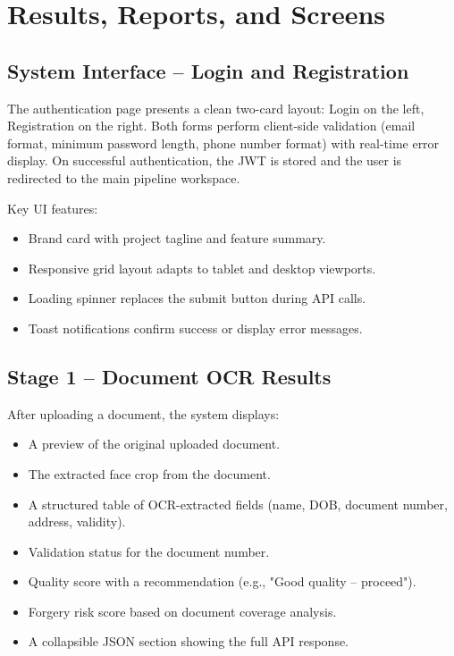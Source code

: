 \chapter{Results, Reports, and Screens}

\section{System Interface -- Login and Registration}

The authentication page presents a clean two-card layout: Login on the left, Registration on the right. Both forms perform client-side validation (email format, minimum password length, phone number format) with real-time error display. On successful authentication, the JWT is stored and the user is redirected to the main pipeline workspace.

Key UI features:
\begin{itemize}
    \item Brand card with project tagline and feature summary.
    \item Responsive grid layout adapts to tablet and desktop viewports.
    \item Loading spinner replaces the submit button during API calls.
    \item Toast notifications confirm success or display error messages.
\end{itemize}

\section{Stage 1 -- Document OCR Results}

After uploading a document, the system displays:
\begin{itemize}
    \item A preview of the original uploaded document.
    \item The extracted face crop from the document.
    \item A structured table of OCR-extracted fields (name, DOB, document number, address, validity).
    \item Validation status for the document number.
    \item Quality score with a recommendation (e.g., "Good quality -- proceed").
    \item Forgery risk score based on document coverage analysis.
    \item A collapsible JSON section showing the full API response.
\end{itemize}

